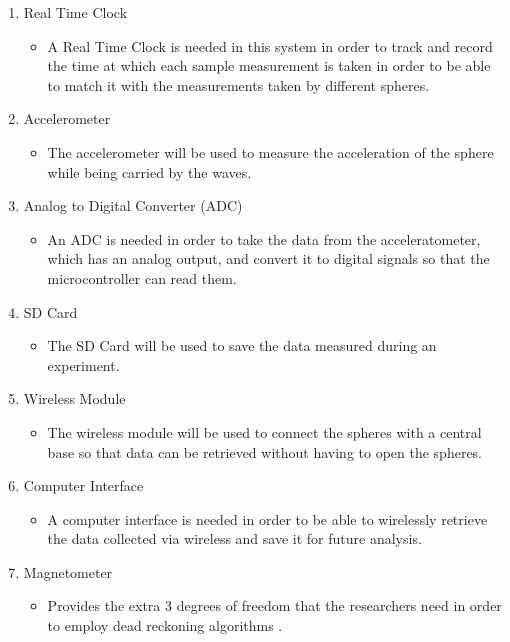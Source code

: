 \begin{enumerate}
\begin{itemize}
\end{itemize}
\item Real Time Clock
\begin{itemize}
\item A Real Time Clock is needed in this system in order to track and record the time at which each sample measurement is taken in order to be able to match it with the measurements taken by different spheres.
\end{itemize}
\item Accelerometer
\begin{itemize}
\item The accelerometer will be used to measure the acceleration of the sphere while being carried by the waves.
\end{itemize}
\item Analog to Digital Converter (ADC)
\begin{itemize}
\item An ADC is needed in order to take the data from the acceleratometer, which has an analog output, and convert it to digital signals so that the microcontroller can read them.
\end{itemize}
\item SD Card
\begin{itemize}
\item The SD Card will be used to save the data measured during an experiment.
\end{itemize}
\item Wireless Module
\begin{itemize}
\item The wireless module will be used to connect the spheres with a central base so that data can be retrieved without having to open the spheres.
\end{itemize}
\item Computer Interface
\begin{itemize}
\item A computer interface is needed in order to be able to wirelessly retrieve the data collected via wireless and save it for future analysis. 
\end{itemize}

\item Magnetometer
\begin{itemize}
\item Provides the extra 3 degrees of freedom that the researchers need in order to employ dead reckoning algorithms \cite{Canals2012}.
\end{itemize}
\end{enumerate}

